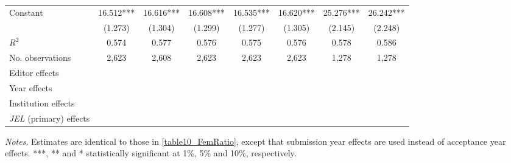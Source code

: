 \begin{table}[H]
\begin{adjustwidth}{-0.085cm}{}
\begin{threeparttable}
\begin{tabular}{p{2.64cm}SSSSSSS}
            Constant                      &      16.512***&      16.616***&      16.608***&      16.535***&      16.620***&      25.276***&      26.242***\\
                                          &     (1.273)   &     (1.304)   &     (1.299)   &     (1.277)   &     (1.305)   &     (2.145)   &     (2.248)   \\
            \midrule
            \(R^2\)                       &       0.574   &       0.577   &       0.576   &       0.575   &       0.576   &       0.578   &       0.586   \\
            No. observations              &       2,623   &       2,608   &       2,623   &       2,623   &       2,623   &       1,278   &       1,278   \\
            \midrule
            Editor effects        &           {}   &           {}   &           {}   &           {}   &           {}   &           {}   &           {}   \\
            Year effects                  &           {}   &           {}   &           {}   &           {}   &           {}   &           {}   &           {}   \\
            Institution effects           &           {}   &           {}   &           {}   &           {}   &           {}   &           {}   &           {}   \\
            \textit{JEL} (primary) effects&               &               &               &               &               &               &           {}   \\
            \bottomrule
        \end{tabular}
        \begin{tablenotes}
            \tiny
            \item \textit{Notes}. Estimates are identical to those in \autoref{table10_FemRatio}, except that submission year effects are used instead of acceptance year effects. ***, ** and * statistically significant at 1\%, 5\% and 10\%, respectively.
        \end{tablenotes}
    \end{threeparttable}
    \end{adjustwidth}
\end{table}